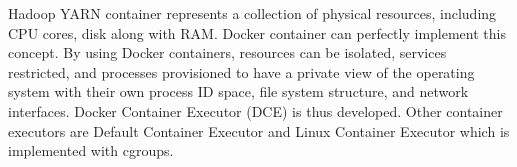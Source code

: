 Hadoop YARN container represents a collection of physical resources, including CPU cores, disk along with RAM. Docker container can perfectly implement this concept. By using Docker containers, resources can be isolated, services restricted, and processes provisioned to have a private view of the operating system with their own process ID space, file system structure, and network interfaces. Docker Container Executor (DCE) is thus developed. Other container executors are Default Container Executor and Linux Container Executor which is implemented with cgroups.

